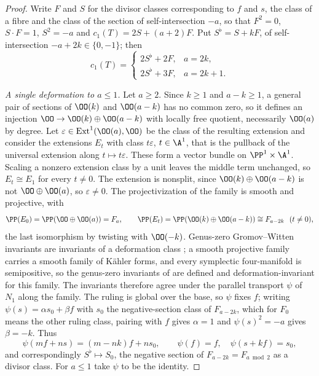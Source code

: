 \begin{proof}
Write \(F\) and \(S\) for the divisor classes corresponding to \(f\) and
\(s\), the class of a fibre and the class of the section of self-intersection
\(-a\), so that \(F^2=0\), \(S\cdot F=1\), \(S^2=-a\) and
\(c_1(T)=2S+(a+2)F\).  Put \(S^\flat=S+kF\), of self-intersection
\(-a+2k\in\{0,-1\}\); then
\[
 c_1(T)=
 \begin{cases}
  2S^\flat+2F, & a=2k,\\
  2S^\flat+3F, & a=2k+1.
 \end{cases}
\]

\emph{A single deformation to \(a\le1\).}  Let \(a\ge2\).  Since
\(k\ge1\) and
\(a-k\ge1\), a general pair of sections of \(\OO(k)\) and \(\OO(a-k)\) has no
common zero, so it defines an injection \(\OO\to\OO(k)\oplus\OO(a-k)\) with
locally free quotient, necessarily \(\OO(a)\) by degree.  Let
\(\varepsilon\in\operatorname{Ext}^1(\OO(a),\OO)\) be the class of the
resulting extension and consider the extensions \(E_t\) with class
\(t\varepsilon\), \(t\in\A^1\), that is the pullback of the universal
extension along \(t\mapsto t\varepsilon\).  These form a vector bundle on
\(\PP^1\times\A^1\).  Scaling a nonzero extension class by a unit leaves the
middle term unchanged, so \(E_t\cong E_1\) for every \(t\ne0\).  The
extension is nonsplit, since \(\OO(k)\oplus\OO(a-k)\) is not
\(\OO\oplus\OO(a)\), so \(\varepsilon\ne0\).  The projectivization of the
family is smooth and projective, with
\[
 \PP(E_0)=\PP(\OO\oplus\OO(a))=F_a,
 \qquad
 \PP(E_t)=\PP(\OO(k)\oplus\OO(a-k))\cong F_{a-2k}\ \ (t\ne0),
\]
the last isomorphism by twisting with \(\OO(-k)\).  Genus-zero Gromov--Witten
invariants are invariants of a deformation class
\cite[Chapter~7]{McDuffSalamon}; a smooth projective family carries a smooth
family of Kähler forms, and every symplectic four-manifold is semipositive, so
the genus-zero invariants of \cite{McDuffSalamon} are defined and
deformation-invariant for this family.  The invariants therefore agree under
the parallel
transport \(\psi\) of \(N_1\) along the family.  The ruling is global over the
base, so \(\psi\) fixes \(f\); writing \(\psi(s)=\alpha s_0+\beta f\) with
\(s_0\) the negative-section class of \(F_{a-2k}\), which for \(F_0\) means
the other ruling class, pairing with \(f\) gives
\(\alpha=1\) and \(\psi(s)^2=-a\) gives \(\beta=-k\).  Thus
\[
 \psi(mf+ns)=(m-nk)f+ns_0,
 \qquad
 \psi(f)=f,\quad \psi(s+kf)=s_0,
\]
and correspondingly \(S^\flat\mapsto S_0\), the negative section of
\(F_{a-2k}=F_{a\bmod2}\) as a divisor class.  For \(a\le1\) take \(\psi\) to
be the identity.


\end{proof}
